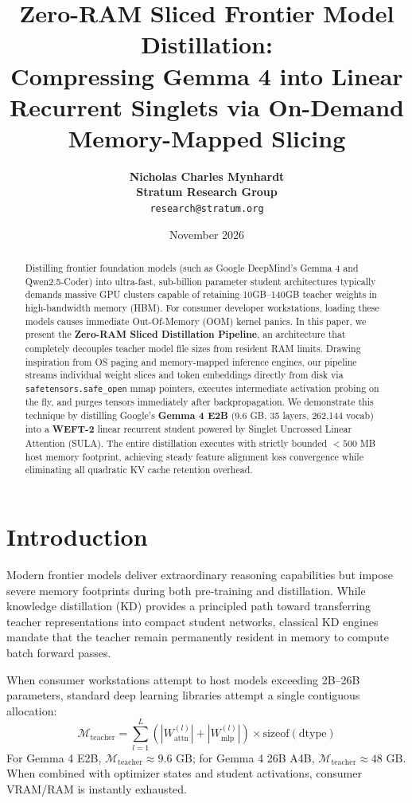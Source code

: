 \documentclass[11pt,a4paper]{article}
\title{\textbf{Zero-RAM Sliced Frontier Model Distillation: \\ Compressing Gemma 4 into Linear Recurrent Singlets via On-Demand Memory-Mapped Slicing}}
\author{
  \textbf{Nicholas Charles Mynhardt} \\
  \textbf{Stratum Research Group} \\
    \texttt{research@stratum.org}
}
\date{November 2026}
\begin{document}
\maketitle

\begin{abstract}
Distilling frontier foundation models (such as Google DeepMind's Gemma 4 and Qwen2.5-Coder) into ultra-fast, sub-billion parameter student architectures typically demands massive GPU clusters capable of retaining 10GB--140GB teacher weights in high-bandwidth memory (HBM). For consumer developer workstations, loading these models causes immediate Out-Of-Memory (OOM) kernel panics. In this paper, we present the \textbf{Zero-RAM Sliced Distillation Pipeline}, an architecture that completely decouples teacher model file sizes from resident RAM limits. Drawing inspiration from OS paging and memory-mapped inference engines, our pipeline streams individual weight slices and token embeddings directly from disk via \texttt{safetensors.safe\_open} mmap pointers, executes intermediate activation probing on the fly, and purges tensors immediately after backpropagation. We demonstrate this technique by distilling Google's \textbf{Gemma 4 E2B} (9.6 GB, 35 layers, 262,144 vocab) into a \textbf{WEFT-2} linear recurrent student powered by Singlet Uncrossed Linear Attention (SULA). The entire distillation executes with strictly bounded $< 500$ MB host memory footprint, achieving steady feature alignment loss convergence while eliminating all quadratic KV cache retention overhead.
\end{abstract}

\section{Introduction}
Modern frontier models deliver extraordinary reasoning capabilities but impose severe memory footprints during both pre-training and distillation. While knowledge distillation (KD) provides a principled path toward transferring teacher representations into compact student networks, classical KD engines mandate that the teacher remain permanently resident in memory to compute batch forward passes.

When consumer workstations attempt to host models exceeding 2B--26B parameters, standard deep learning libraries attempt a single contiguous allocation:
\begin{equation}
\mathcal{M}_{\text{teacher}} = \sum_{l=1}^{L} (|W_{\text{attn}}^{(l)}| + |W_{\text{mlp}}^{(l)}|) \times \text{sizeof}(\text{dtype})
\end{equation}
For Gemma 4 E2B, $\mathcal{M}_{\text{teacher}} \approx 9.6\text{ GB}$; for Gemma 4 26B A4B, $\mathcal{M}_{\text{teacher}} \approx 48\text{ GB}$. When combined with optimizer states and student activations, consumer VRAM/RAM is instantly exhausted.
\end{document}
